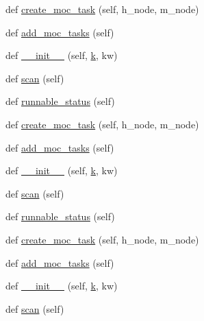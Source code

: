 \begin{DoxyCompactItemize}
\item 
def \hyperlink{classwaflib_1_1_tools_1_1qt4_1_1qxx_aff019276ea1c24be0da32fb4a6d3da06}{create\+\_\+moc\+\_\+task} (self, h\+\_\+node, m\+\_\+node)
\item 
def \hyperlink{classwaflib_1_1_tools_1_1qt4_1_1qxx_aec5aad1a23675343a8b270b0e8c15b0c}{add\+\_\+moc\+\_\+tasks} (self)
\item 
def \hyperlink{classwaflib_1_1_tools_1_1qt4_1_1qxx_a7bc6ffa8a31c2b612eb2fac82ab4c052}{\+\_\+\+\_\+init\+\_\+\+\_\+} (self, \hyperlink{rfft2d_test_m_l_8m_adc468c70fb574ebd07287b38d0d0676d}{k}, kw)
\item 
def \hyperlink{classwaflib_1_1_tools_1_1qt4_1_1qxx_acdd5c674e2585b425a25735b665eeb14}{scan} (self)
\item 
def \hyperlink{classwaflib_1_1_tools_1_1qt4_1_1qxx_aa3fd0759668664632f019ae7c118406d}{runnable\+\_\+status} (self)
\item 
def \hyperlink{classwaflib_1_1_tools_1_1qt4_1_1qxx_aff019276ea1c24be0da32fb4a6d3da06}{create\+\_\+moc\+\_\+task} (self, h\+\_\+node, m\+\_\+node)
\item 
def \hyperlink{classwaflib_1_1_tools_1_1qt4_1_1qxx_aec5aad1a23675343a8b270b0e8c15b0c}{add\+\_\+moc\+\_\+tasks} (self)
\item 
def \hyperlink{classwaflib_1_1_tools_1_1qt4_1_1qxx_a7bc6ffa8a31c2b612eb2fac82ab4c052}{\+\_\+\+\_\+init\+\_\+\+\_\+} (self, \hyperlink{rfft2d_test_m_l_8m_adc468c70fb574ebd07287b38d0d0676d}{k}, kw)
\item 
def \hyperlink{classwaflib_1_1_tools_1_1qt4_1_1qxx_acdd5c674e2585b425a25735b665eeb14}{scan} (self)
\item 
def \hyperlink{classwaflib_1_1_tools_1_1qt4_1_1qxx_aa3fd0759668664632f019ae7c118406d}{runnable\+\_\+status} (self)
\item 
def \hyperlink{classwaflib_1_1_tools_1_1qt4_1_1qxx_aff019276ea1c24be0da32fb4a6d3da06}{create\+\_\+moc\+\_\+task} (self, h\+\_\+node, m\+\_\+node)
\item 
def \hyperlink{classwaflib_1_1_tools_1_1qt4_1_1qxx_aec5aad1a23675343a8b270b0e8c15b0c}{add\+\_\+moc\+\_\+tasks} (self)
\item 
def \hyperlink{classwaflib_1_1_tools_1_1qt4_1_1qxx_a7bc6ffa8a31c2b612eb2fac82ab4c052}{\+\_\+\+\_\+init\+\_\+\+\_\+} (self, \hyperlink{rfft2d_test_m_l_8m_adc468c70fb574ebd07287b38d0d0676d}{k}, kw)
\item 
def \hyperlink{classwaflib_1_1_tools_1_1qt4_1_1qxx_acdd5c674e2585b425a25735b665eeb14}{scan} (self)
\item 

\end{DoxyCompactItemize}
